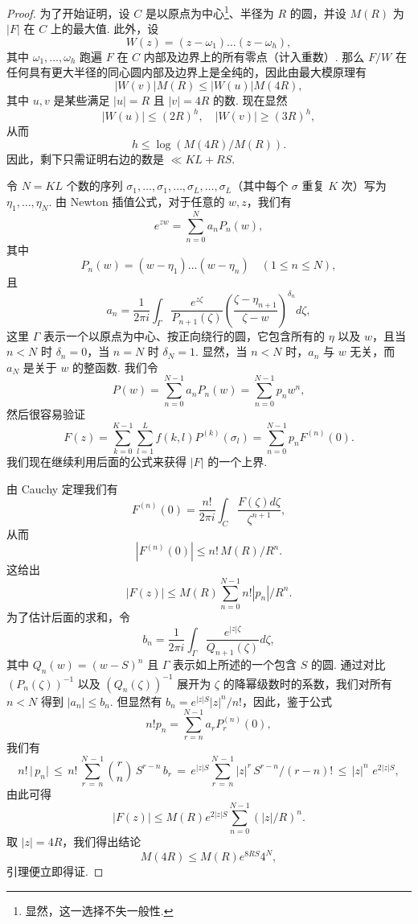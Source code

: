 \begin{proof}
为了开始证明，设 $C$ 是以原点为中心\footnote{显然，这一选择不失一般性.}、半径为 $R$ 的圆，并设 $M(R)$ 为 $|F|$ 在 $C$ 上的最大值. 此外，设
\[W(z) = (z - \omega_1) \dots (z - \omega_h),\]
其中 $\omega_1, \ldots, \omega_h$ 跑遍 $F$ 在 $C$ 内部及边界上的所有零点（计入重数）. 那么 $F/W$ 在任何具有更大半径的同心圆内部及边界上是全纯的，因此由最大模原理有
\[|W(v)|M(R) \leq |W(u)|M(4R),\]
其中 $u, v$ 是某些满足 $|u| = R$ 且 $|v| = 4R$ 的数. 现在显然
\[|W(u)| \leq (2R)^h, \quad |W(v)| \geq (3R)^h,\]
从而
\[h \leqslant \log (M(4R)/M(R)).\]
因此，剩下只需证明右边的数是 $\ll KL + RS$.

令 $N = KL$ 个数的序列 $\sigma_1, \ldots, \sigma_1, \ldots, \sigma_L, \ldots, \sigma_L$（其中每个 $\sigma$ 重复 $K$ 次）写为 $\eta_1, \ldots, \eta_N$. 由 Newton 插值公式，对于任意的 $w, z$，我们有
\[e^{zw} = \sum_{n=0}^{N} a_n P_n(w),\]
其中
\[P_n(w) = (w - \eta_1) \dots (w - \eta_n) \quad (1 \le n \le N),\]
且
\[a_n = \frac{1}{2\pi i} \int_{\Gamma} \frac{e^{z\zeta}}{P_{n+1}(\zeta)} \left( \frac{\zeta - \eta_{n+1}}{\zeta - w} \right)^{\delta_n} d\zeta,\]
这里 $\Gamma$ 表示一个以原点为中心、按正向绕行的圆，它包含所有的 $\eta$ 以及 $w$，且当 $n < N$ 时 $\delta_n = 0$，当 $n = N$ 时 $\delta_N = 1$. 显然，当 $n < N$ 时，$a_n$ 与 $w$ 无关，而 $a_N$ 是关于 $w$ 的整函数. 我们令
\[P(w) = \sum_{n=0}^{N-1} a_n P_n(w) = \sum_{n=0}^{N-1} p_n w^n,\]
然后很容易验证
\[F(z) = \sum_{k=0}^{K-1} \sum_{l=1}^{L} f(k,l) P^{(k)}(\sigma_l) = \sum_{n=0}^{N-1} p_n F^{(n)}(0).\]
我们现在继续利用后面的公式来获得 $|F|$ 的一个上界.

由 Cauchy 定理我们有
\[F^{(n)}(0) = \frac{n!}{2\pi i} \int_C \frac{F(\zeta) d\zeta}{\zeta^{n+1}},\]
从而
\[\left|F^{(n)}(0)\right| \leqslant n! \, M(R)/R^n.\]
这给出
\[|F(z)| \leqslant M(R) \sum_{n=0}^{N-1} n! |p_n|/R^n.\]
为了估计后面的求和，令
\[b_n = \frac{1}{2\pi i} \int_{\Gamma} \frac{e^{|z|\zeta}}{Q_{n+1}(\zeta)} d\zeta,\]
其中 $Q_n(w) = (w-S)^n$ 且 $\Gamma$ 表示如上所述的一个包含 $S$ 的圆. 通过对比 $(P_n(\zeta))^{-1}$ 以及 $(Q_n(\zeta))^{-1}$ 展开为 $\zeta$ 的降幂级数时的系数，我们对所有 $n < N$ 得到 $|a_n| \leq b_n$. 但显然有 $b_n = e^{|z|S} |z|^n/n!$，因此，鉴于公式
\[n! p_n = \sum_{r=n}^{N-1} a_r P_r^{(n)}(0),\]
我们有
\[n! \, \big| \, p_n \big| \, \leqslant \, n! \, \sum_{r \, = \, n}^{N \, - \, 1} \binom{r}{n} \, S^{r - n} \, b_r \, = \, e^{|z| S} \sum_{r \, = \, n}^{N \, - \, 1} \big| z \big|^r \, S^{r - n} / (r - n)! \, \leqslant \, \big| z \big|^n \, \, e^{2|z|S},\]
由此可得
\[|F(z)| \leq M(R) e^{2|z|S} \sum_{n=0}^{N-1} (|z|/R)^n.\]
取 $|z| = 4R$，我们得出结论
\[M(4R) \leqslant M(R) e^{8RS} 4^N,\]
引理便立即得证.
\end{proof}

